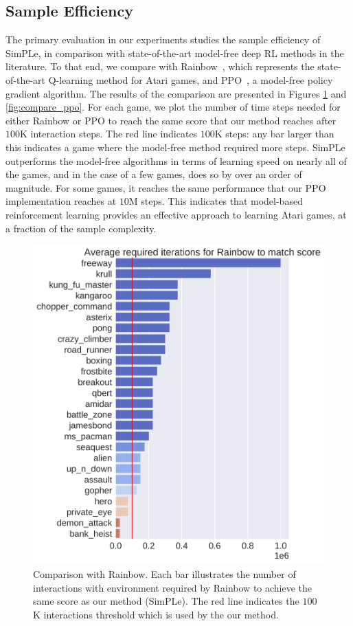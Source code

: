 \subsection{Sample Efficiency}
The primary evaluation in our experiments studies the sample efficiency of SimPLe, in comparison with state-of-the-art model-free deep RL methods in the literature. To that end, we compare with  Rainbow~\cite{rainbow,DBLP:journals/corr/abs-1812-06110}, which represents the state-of-the-art Q-learning method for Atari games, and PPO~\cite{ppo}, a model-free policy gradient algorithm. The results of the comparison are presented in Figures \ref{fig:compare_dopamine} and \ref{fig:compare_ppo}. For each game, we plot the number of time steps needed for either Rainbow or PPO to reach the same score that our method reaches after $100$K interaction steps. The red line indicates $100$K steps: any bar larger than this indicates a game where the model-free method required more steps. SimPLe outperforms the model-free algorithms in terms of learning speed on nearly all of the games, and in the case of a few games, does so by over an order of magnitude. For some games, it reaches the same performance that our PPO implementation reaches at $10$M steps. This indicates that model-based reinforcement learning provides an effective approach to learning Atari games, at a fraction of the sample complexity.

\begin{figure}[t]
\centering
\includegraphics[width=1.0\columnwidth]{figures/main_ver.png}
\vspace{-0.2cm}
\caption{Comparison with Rainbow. Each bar illustrates the number of interactions with environment required by Rainbow to achieve the same score as our method (SimPLe). The red line indicates the $100$K interactions threshold which is used by the our method.} 
\label{fig:compare_dopamine}
\end{figure}

